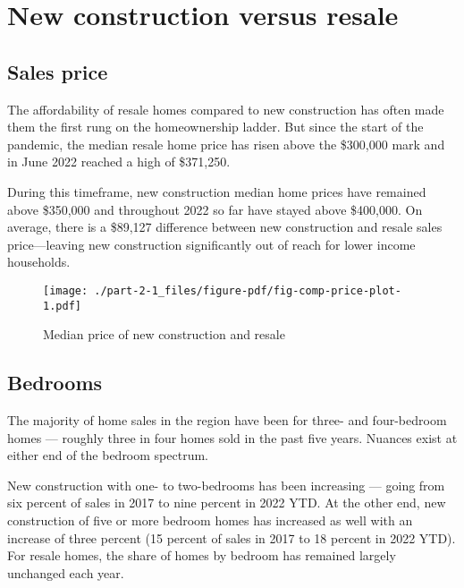 \documentclass[
  letterpaper,
  DIV=11,
  numbers=noendperiod]{scrreprt}
\begin{document}
\hypertarget{new-construction-versus-resale}{%
\section{New construction versus
resale}\label{new-construction-versus-resale}}

\hypertarget{sales-price-1}{%
\subsection{Sales price}\label{sales-price-1}}

The affordability of resale homes compared to new construction has often
made them the first rung on the homeownership ladder. But since the
start of the pandemic, the median resale home price has risen above the
\$300,000 mark and in June 2022 reached a high of \$371,250.

During this timeframe, new construction median home prices have remained
above \$350,000 and throughout 2022 so far have stayed above \$400,000.
On average, there is a \$89,127 difference between new construction and
resale sales price---leaving new construction significantly out of reach
for lower income households.

\begin{figure}

{\centering \texttt{[image: ./part-2-1\_files/figure-pdf/fig-comp-price-plot-1.pdf]}

}

\caption{\label{fig-comp-price-plot}Median price of new construction and
resale}

\end{figure}

\hypertarget{bedrooms-1}{%
\subsection{Bedrooms}\label{bedrooms-1}}

The majority of home sales in the region have been for three- and
four-bedroom homes --- roughly three in four homes sold in the past five
years. Nuances exist at either end of the bedroom spectrum.

New construction with one- to two-bedrooms has been increasing --- going
from six percent of sales in 2017 to nine percent in 2022 YTD. At the
other end, new construction of five or more bedroom homes has increased
as well with an increase of three percent (15 percent of sales in 2017
to 18 percent in 2022 YTD). For resale homes, the share of homes by
bedroom has remained largely unchanged each year.
\end{document}
